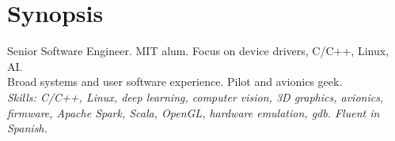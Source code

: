 \section{Synopsis}
Senior Software Engineer. MIT alum. Focus on device drivers, C/C++, Linux, AI.\\
Broad systems and user software experience. Pilot and avionics geek. \\
\emph{Skills: C/C++, Linux, deep learning, computer vision, 3D graphics, avionics, firmware, Apache Spark, Scala, OpenGL, hardware emulation, gdb. Fluent in Spanish.}

